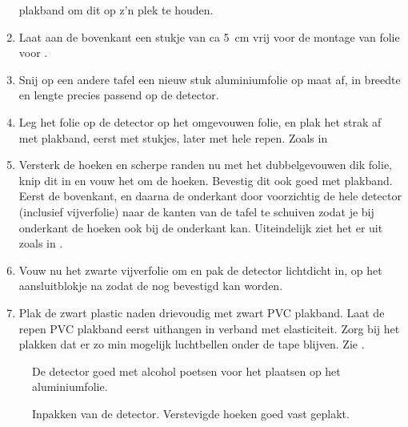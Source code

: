 \begin{enumerate}
    plakband om dit op z'n plek te houden.
    \item Laat aan de bovenkant een stukje van ca \SI{5}{\centi\meter}
    vrij voor de montage van folie voor \pmt.
    \item Snij op een andere tafel een nieuw stuk aluminiumfolie op maat
    af, in breedte en lengte precies passend op de detector.
    \item Leg het folie op de detector op het omgevouwen folie, en plak
    het strak af met plakband, eerst met stukjes, later met hele repen.
    Zoals in 
    \item Versterk de hoeken en scherpe randen nu met het dubbelgevouwen
    dik folie, knip dit in en vouw het om de hoeken. Bevestig dit ook
    goed met plakband. Eerst de bovenkant, en daarna de onderkant door
    voorzichtig de hele detector (inclusief vijverfolie) naar de kanten
    van de tafel te schuiven zodat je bij onderkant de hoeken ook bij de
    onderkant kan. Uiteindelijk ziet het er uit zoals in
    .
    \item Vouw nu het zwarte vijverfolie om en pak de detector lichtdicht
    in, op het aansluitblokje na zodat de \pmt nog bevestigd kan worden.
    \item Plak de zwart plastic naden drievoudig met zwart PVC plakband.
    Laat de repen PVC plakband eerst uithangen in verband met
    elasticiteit. Zorg bij het plakken dat er zo min mogelijk
    luchtbellen onder de tape blijven. Zie .
\end{enumerate}

\begin{figure}
    \centering
    \caption{De detector goed met alcohol poetsen voor het plaatsen op
             het aluminiumfolie.}
\end{figure}

\begin{figure}
    \centering
    \caption{Inpakken van de detector. Verstevigde hoeken goed vast geplakt.}
\end{figure}

